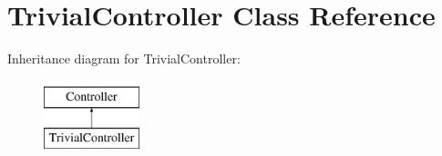 \hypertarget{classTrivialController}{
\section{TrivialController Class Reference}
\label{classTrivialController}
}
Inheritance diagram for TrivialController:\begin{figure}[H]
\begin{center}
\leavevmode
\includegraphics[height=2cm]{classTrivialController}
\end{center}
\end{figure}
